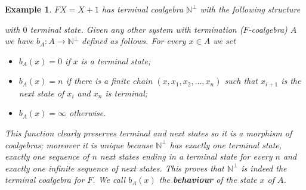 \documentclass[letterpaper, 11pt, oneside]{memoir}
\theoremstyle{myteo}
\newtheorem{example}[theorem]{Example}
\numberwithin{equation}{section}
\begin{document}
\begin{example}
  \(FX = X + 1\) has terminal coalgebra \(\mathbb{N}^\bot\) with the following structure
  \begin{center}
  \end{center}
  with \(0\) terminal state.
  Given any other system with termination (\(F\)-coalgebra) \(A\) we have \(b_A : A \to \mathbb{N}^\bot\) defined as follows.
  For every \(x \in A\) we set
  \begin{itemize}
  \item[1.] \(b_A(x) = 0\) if \(x\) is a terminal state;
  \item[2.] \(b_A(x) = n\) if there is a finite chain \((x, x_1, x_2, \ldots, x_n)\) such that \(x_{i+1}\) is the next state of \(x_i\) and \(x_n\) is terminal;
  \item[3.] \(b_A(x) = \infty\) otherwise.
  \end{itemize}
  This function clearly preserves terminal and next states so it is a morphism of coalgebras; moreover it is unique because \(\mathbb{N}^\bot\) has exactly one terminal state, exactly one sequence of \(n\) next states ending in a terminal state for every \(n\) and exactly one infinite sequence of next states.
  This proves that \(\mathbb{N}^\bot\) is indeed the terminal coalgebra for \(F\).
  We call \(b_A(x)\) the \textbf{behaviour} of the state \(x\) of \(A\).
\end{example}
\end{document}
